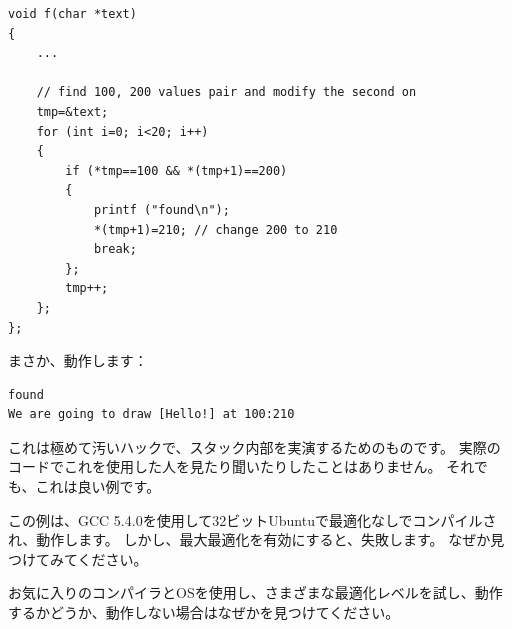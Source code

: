 \begin{lstlisting}[style=customc]
void f(char *text)
{
	...

	// find 100, 200 values pair and modify the second on
	tmp=&text;
	for (int i=0; i<20; i++)
	{
		if (*tmp==100 && *(tmp+1)==200)
		{
			printf ("found\n");
			*(tmp+1)=210; // change 200 to 210
			break;
		};
		tmp++;
	};
};
\end{lstlisting}

まさか、動作します：

\begin{lstlisting}
found
We are going to draw [Hello!] at 100:210
\end{lstlisting}


これは極めて汚いハックで、スタック内部を実演するためのものです。
実際のコードでこれを使用した人を見たり聞いたりしたことはありません。
それでも、これは良い例です。

\myparagraph{\Exercise}

この例は、GCC 5.4.0を使用して32ビットUbuntuで最適化なしでコンパイルされ、動作します。
しかし、最大最適化を有効にすると、失敗します。
なぜか見つけてみてください。

お気に入りのコンパイラとOSを使用し、さまざまな最適化レベルを試し、動作するかどうか、動作しない場合はなぜかを見つけてください。